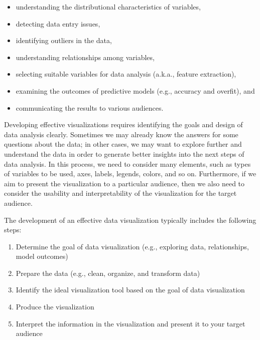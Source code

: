 \documentclass[]{book}
\providecommand{\tightlist}{%
  \setlength{\itemsep}{0pt}\setlength{\parskip}{0pt}}
\begin{document}
\begin{itemize}
\tightlist
\item
  understanding the distributional characteristics of variables,
\item
  detecting data entry issues,
\item
  identifying outliers in the data,
\item
  understanding relationships among variables,
\item
  selecting suitable variables for data analysis (a.k.a., feature extraction),
\item
  examining the outcomes of predictive models (e.g., accuracy and overfit), and
\item
  communicating the results to various audiences.
\end{itemize}

Developing effective visualizations requires identifying the goals and design of data analysis clearly. Sometimes we may already know the answers for some questions about the data; in other cases, we may want to explore further and understand the data in order to generate better insights into the next steps of data analysis. In this process, we need to consider many elements, such as types of variables to be used, axes, labels, legends, colors, and so on. Furthermore, if we aim to present the visualization to a particular audience, then we also need to consider the usability and interpretability of the visualization for the target audience.

The development of an effective data visualization typically includes the following steps:

\begin{enumerate}
\def\labelenumi{\arabic{enumi}.}
\tightlist
\item
  Determine the goal of data visualization (e.g., exploring data, relationships, model outcomes)
\item
  Prepare the data (e.g., clean, organize, and transform data)
\item
  Identify the ideal visualization tool based on the goal of data visualization
\item
  Produce the visualization
\item
  Interpret the information in the visualization and present it to your target audience
\end{enumerate}
\end{document}
